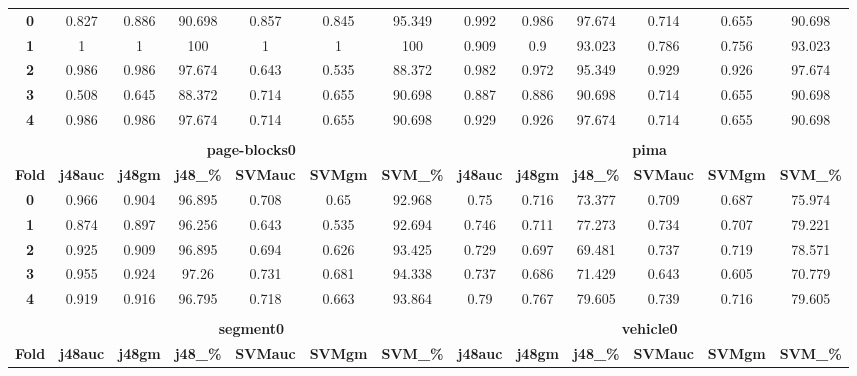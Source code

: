 {{\begin{tabular}{c|cccccc|cccccc}
\midrule
\textbf{0} & 0.827 & 0.886 & 90.698 & 0.857 & 0.845 & 95.349 & 0.992 & 0.986 & 97.674 & 0.714 & 0.655 & 90.698 \\
\textbf{1} & 1     & 1     & 100   & 1     & 1     & 100   & 0.909 & 0.9   & 93.023 & 0.786 & 0.756 & 93.023 \\
\textbf{2} & 0.986 & 0.986 & 97.674 & 0.643 & 0.535 & 88.372 & 0.982 & 0.972 & 95.349 & 0.929 & 0.926 & 97.674 \\
\textbf{3} & 0.508 & 0.645 & 88.372 & 0.714 & 0.655 & 90.698 & 0.887 & 0.886 & 90.698 & 0.714 & 0.655 & 90.698 \\
\textbf{4} & 0.986 & 0.986 & 97.674 & 0.714 & 0.655 & 90.698 & 0.929 & 0.926 & 97.674 & 0.714 & 0.655 & 90.698 \\
\multicolumn{1}{c}{} &       &       &       &       &       & \multicolumn{1}{c}{} &       &       &       &       &       &  \\
\multicolumn{1}{c}{} & \multicolumn{6}{c|}{\textbf{page-blocks0}}    & \multicolumn{6}{c}{\textbf{pima}} \\
\midrule
\textbf{Fold} & \textbf{j48auc} & \textbf{j48gm} & \textbf{j48\_\%} & \textbf{SVMauc} & \textbf{SVMgm} & \textbf{SVM\_\%} & \textbf{j48auc} & \textbf{j48gm} & \textbf{j48\_\%} & \textbf{SVMauc} & \textbf{SVMgm} & \textbf{SVM\_\%} \\
\midrule
\textbf{0} & 0.966 & 0.904 & 96.895 & 0.708 & 0.65  & 92.968 & 0.75  & 0.716 & 73.377 & 0.709 & 0.687 & 75.974 \\
\textbf{1} & 0.874 & 0.897 & 96.256 & 0.643 & 0.535 & 92.694 & 0.746 & 0.711 & 77.273 & 0.734 & 0.707 & 79.221 \\
\textbf{2} & 0.925 & 0.909 & 96.895 & 0.694 & 0.626 & 93.425 & 0.729 & 0.697 & 69.481 & 0.737 & 0.719 & 78.571 \\
\textbf{3} & 0.955 & 0.924 & 97.26 & 0.731 & 0.681 & 94.338 & 0.737 & 0.686 & 71.429 & 0.643 & 0.605 & 70.779 \\
\textbf{4} & 0.919 & 0.916 & 96.795 & 0.718 & 0.663 & 93.864 & 0.79  & 0.767 & 79.605 & 0.739 & 0.716 & 79.605 \\
\multicolumn{1}{c}{} &       &       &       &       &       & \multicolumn{1}{c}{} &       &       &       &       &       &  \\
\multicolumn{1}{c}{} & \multicolumn{6}{c|}{\textbf{segment0}}        & \multicolumn{6}{c}{\textbf{vehicle0}} \\
\midrule
\textbf{Fold} & \textbf{j48auc} & \textbf{j48gm} & \textbf{j48\_\%} & \textbf{SVMauc} & \textbf{SVMgm} & \textbf{SVM\_\%} & \textbf{j48auc} & \textbf{j48gm} & \textbf{j48\_\%} & \textbf{SVMauc} & \textbf{SVMgm} & \textbf{SVM\_\%} \\

\end{tabular}}}
